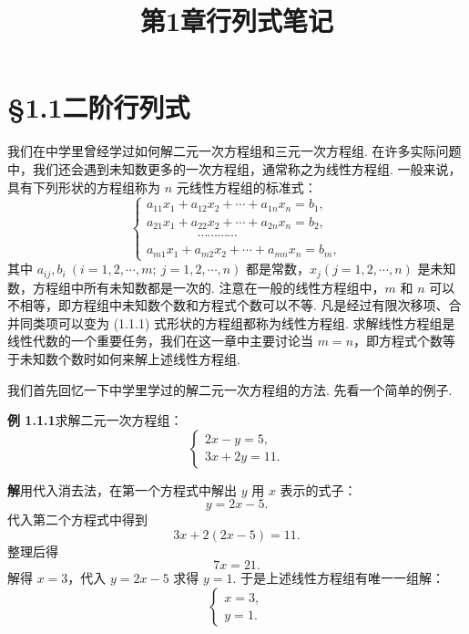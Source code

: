 \documentclass[UTF8,12pt,a4paper,fontset=fandol]{ctexart}
\title{第1章\quad 行列式笔记}
\author{}
\date{}
\begin{document}
\maketitle

\section*{§1.1\quad 二阶行列式}

我们在中学里曾经学过如何解二元一次方程组和三元一次方程组. 在许多实际问题中，我们还会遇到未知数更多的一次方程组，通常称之为线性方程组. 一般来说，具有下列形状的方程组称为 $n$ 元线性方程组的标准式：
\begin{equation}
\left\{
\begin{array}{l}
a_{11}x_1+a_{12}x_2+\cdots+a_{1n}x_n=b_1,\\
a_{21}x_1+a_{22}x_2+\cdots+a_{2n}x_n=b_2,\\
\hspace{4em}\cdots\cdots\cdots\cdots\\
a_{m1}x_1+a_{m2}x_2+\cdots+a_{mn}x_n=b_m,
\end{array}
\right.
\tag{1.1.1}
\end{equation}
其中 $a_{ij}, b_i\ (i=1,2,\cdots,m;\ j=1,2,\cdots,n)$ 都是常数，$x_j(j=1,2,\cdots,n)$ 是未知数，方程组中所有未知数都是一次的. 注意在一般的线性方程组中，$m$ 和 $n$ 可以不相等，即方程组中未知数个数和方程式个数可以不等. 凡是经过有限次移项、合并同类项可以变为 (1.1.1) 式形状的方程组都称为线性方程组. 求解线性方程组是线性代数的一个重要任务，我们在这一章中主要讨论当 $m=n$，即方程式个数等于未知数个数时如何来解上述线性方程组.

我们首先回忆一下中学里学过的解二元一次方程组的方法. 先看一个简单的例子.

\noindent\textbf{例 1.1.1}\quad 求解二元一次方程组：
\begin{equation}
\left\{
\begin{array}{l}
2x-y=5,\\
3x+2y=11.
\end{array}
\right.
\tag{1.1.2}
\end{equation}

\noindent\textbf{解}\quad 用代入消去法，在第一个方程式中解出 $y$ 用 $x$ 表示的式子：
\[
y=2x-5.
\]
代入第二个方程式中得到
\[
3x+2(2x-5)=11.
\]
整理后得
\[
7x=21.
\]
解得 $x=3$，代入 $y=2x-5$ 求得 $y=1$. 于是上述线性方程组有唯一一组解：
\[
\left\{
\begin{array}{l}
x=3,\\
y=1.
\end{array}
\right.
\]
\end{document}
